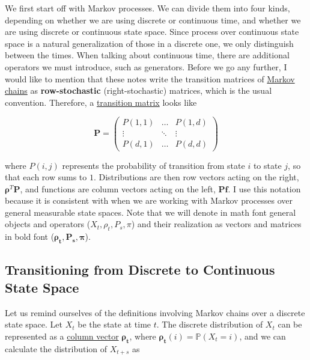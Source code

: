   \begin{example}[Class 2]
    \label{ex:class-2}
    
  \end{example}

  We first start off with Markov processes. We can divide them into four kinds, depending on whether we are using discrete or continuous time, and whether we are using discrete or continuous state space. Since process over continuous state space is a natural generalization of those in a discrete one, we only distinguish between the times. When talking about continuous time, there are additional operators we must introduce, such as generators. Before we go any further, I would like to mention that these notes write the transition matrices of \hyperref[def:markov-chain]{Markov chains} as \textbf{row-stochastic} (right-stochastic) matrices, which is the usual convention. Therefore, a \hyperref[def:transition-matrix]{transition matrix} looks like 

    \begin{equation}
      \mathbf{P} = \begin{pmatrix} P(1, 1) & \ldots & P(1, d) \\ \vdots & \ddots & \vdots \\ P(d, 1) & \ldots & P(d, d) \end{pmatrix}
    \end{equation}

  where $P(i, j)$ represents the probability of transition from state $i$ to state $j$, so that each row sums to $1$. Distributions are then row vectors acting on the right, $\boldsymbol{\rho}^T \mathbf{P}$, and functions are column vectors acting on the left, $\mathbf{P} \mathbf{f}$. I use this notation because it is consistent with when we are working with Markov processes over general measurable state spaces. Note that we will denote in math font general objects and operators ($X_t, \rho_t, P_s, \pi$) and their realization as vectors and matrices in bold font ($\boldsymbol{\rho_t}, \mathbf{P_s}, \boldsymbol{\pi}$). 

  \subsection{Transitioning from Discrete to Continuous State Space}

    Let us remind ourselves of the definitions involving Markov chains over a discrete state space. Let $X_t$ be the state at time $t$. The discrete distribution of $X_t$ can be represented as a \hyperref[lin-def:column-vector]{column vector} $\boldsymbol{\rho_t}$, where $\boldsymbol{\rho_t} (i) = \mathbb{P}(X_t = i)$, and we can calculate the distribution of $X_{t + s}$ as 

